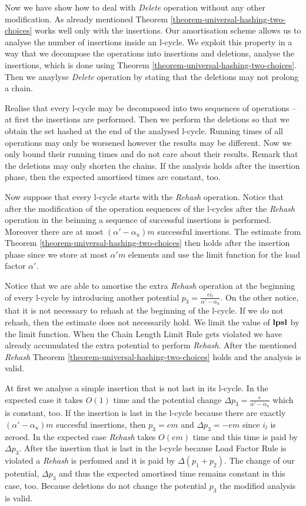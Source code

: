 Now we have show how to deal with \emph{Delete} operation without any other modification. As already mentioned Theorem \ref{theorem-universal-hashing-two-choices} works well only with the insertions. Our amortisation scheme allows us to analyse the number of insertions inside an l-cycle. We exploit this property in a way that we decompose the operations into insertions and deletions, analyse the insertions, which is done using Theorem \ref{theorem-universal-hashing-two-choices}. Then we anaylyse \emph{Delete} operation by stating that the deletions may not prolong a chain.

Realise that every l-cycle may be decomposed into two sequences of operations -- at first the insertions are performed. Then we perform the deletions so that we obtain the set hashed at the end of the analysed l-cycle. Running times of all operations may only be worsened however the results may be different. Now we only bound their running times and do not care about their results. Remark that the deletions may only shorten the chains. If the analysis holds after the insertion phase, then the expected amortised times are constant, too.

Now suppose that every l-cycle starts with the \emph{Rehash} operation. Notice that after the modification of the operation sequences of the l-cycles after the \emph{Rehash} operation in the beinning a sequence of successful insertions is performed. Moreover there are at most $(\alpha' - \alpha_u)m$ successful insertions. The estimate from Theorem \ref{theorem-universal-hashing-two-choices} then holds after the insertion phase since we store at most $\alpha' m$ elements and use the limit function for the load factor $\alpha'$.

Notice that we are able to amortise the extra \emph{Rehash} operation at the beginning of every l-cycle by introducing another potential $p_3 = \frac{e i_l}{\alpha' - \alpha_u}$. On the other notice, that it is not necessary to rehash at the beginning of the l-cycle. If we do not rehash, then the estimate does not necessarily hold. We limit the value of $\mathbf{lpsl}$ by the limit function. When the Chain Length Limit Rule gets violated we have already accumulated the extra potential to perform \emph{Rehash}. After the mentioned \emph{Rehash} Theorem \ref{theorem-universal-hashing-two-choices} holds and the analysis is valid.

At first we analyse a simple insertion that is not last in its l-cycle. In the expected case it takes $O(1)$ time and the potential change $\Delta p_3 = \frac{e}{\alpha' - \alpha_u}$ which is constant, too. If the insertion is last in the l-cycle because there are exactly $(\alpha' - \alpha_u)m$ succesful insertions, then $p_3 = em$ and $\Delta p_3 = -em$ since $i_l$ is zeroed. In the expected case \emph{Rehash} takes $O(em)$ time and this time is paid by $\Delta p_3$. After the insertion that is last in the l-cycle because Load Factor Rule is violated a \emph{Rehash} is perfomed and it is paid by $\Delta (p_1 + p_2)$. The change of our potential, $\Delta p_3$ and thus the expected amortised time remains constant in this case, too. Because deletions do not change the potential $p_3$ the modified analysis is valid.
